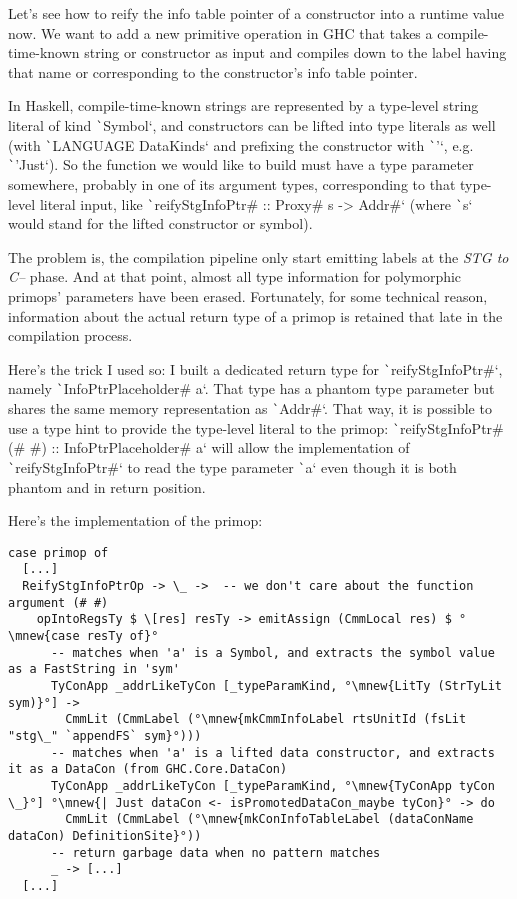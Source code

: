 \documentclass[english]{jflart}
\begin{document}
Let's see how to reify the info table pointer of a constructor into a runtime value now. We want to add a new primitive operation in GHC that takes a compile-time-known string or constructor as input and compiles down to the label having that name or corresponding to the constructor's info table pointer.

In Haskell, compile-time-known strings are represented by a type-level string literal of kind \texttt`Symbol`, and constructors can be lifted into type literals as well (with \texttt`LANGUAGE DataKinds` and prefixing the constructor with \texttt`'`, e.g. \texttt`'Just`). So the function we would like to build must have a type parameter somewhere, probably in one of its argument types, corresponding to that type-level literal input, like \texttt`reifyStgInfoPtr# :: Proxy# s -> Addr#` (where \texttt`s` would stand for the lifted constructor or symbol).

The problem is, the compilation pipeline only start emitting labels at the \emph{STG to C--} phase. And at that point, almost all type information for polymorphic primops' parameters have been erased. Fortunately, for some technical reason, information about the actual return type of a primop is retained that late in the compilation process.

Here's the trick I used so: I built a dedicated return type for \texttt`reifyStgInfoPtr#`, namely \texttt`InfoPtrPlaceholder# a`. That type has a phantom type parameter but shares the same memory representation as \texttt`Addr#`. That way, it is possible to use a type hint to provide the type-level literal to the primop: \texttt`reifyStgInfoPtr# (# #) :: InfoPtrPlaceholder# a` will allow the implementation of \texttt`reifyStgInfoPtr#` to read the type parameter \texttt`a` even though it is both phantom and in return position.

Here's the implementation of the primop:

\begin{verbatim}
case primop of
  [...]
  ReifyStgInfoPtrOp -> \_ ->  -- we don't care about the function argument (# #)
    opIntoRegsTy $ \[res] resTy -> emitAssign (CmmLocal res) $ °\mnew{case resTy of}°
      -- matches when 'a' is a Symbol, and extracts the symbol value as a FastString in 'sym'
      TyConApp _addrLikeTyCon [_typeParamKind, °\mnew{LitTy (StrTyLit sym)}°] ->
        CmmLit (CmmLabel (°\mnew{mkCmmInfoLabel rtsUnitId (fsLit "stg\_" `appendFS` sym}°)))
      -- matches when 'a' is a lifted data constructor, and extracts it as a DataCon (from GHC.Core.DataCon)
      TyConApp _addrLikeTyCon [_typeParamKind, °\mnew{TyConApp tyCon \_}°] °\mnew{| Just dataCon <- isPromotedDataCon_maybe tyCon}° -> do
        CmmLit (CmmLabel (°\mnew{mkConInfoTableLabel (dataConName dataCon) DefinitionSite}°))
      -- return garbage data when no pattern matches
      _ -> [...]
  [...]
\end{verbatim}
\end{document}
